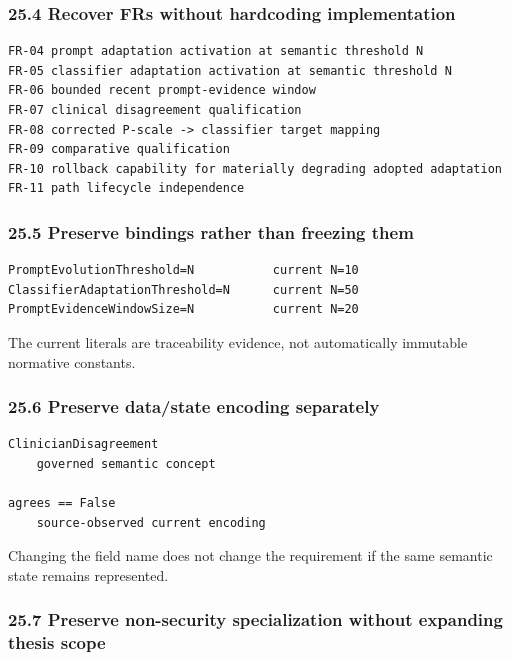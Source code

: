 \documentclass[11pt,a4paper]{article}
\begin{document}
\subsubsection{25.4 Recover FRs without hardcoding
implementation}\label{254-recover-frs-without-hardcoding-implementation}

\begin{verbatim}
FR-04 prompt adaptation activation at semantic threshold N
FR-05 classifier adaptation activation at semantic threshold N
FR-06 bounded recent prompt-evidence window
FR-07 clinical disagreement qualification
FR-08 corrected P-scale -> classifier target mapping
FR-09 comparative qualification
FR-10 rollback capability for materially degrading adopted adaptation
FR-11 path lifecycle independence
\end{verbatim}

\subsubsection{25.5 Preserve bindings rather than freezing
them}\label{255-preserve-bindings-rather-than-freezing-them}

\begin{verbatim}
PromptEvolutionThreshold=N           current N=10
ClassifierAdaptationThreshold=N      current N=50
PromptEvidenceWindowSize=N           current N=20
\end{verbatim}

The current literals are traceability evidence, not automatically
immutable normative constants.

\subsubsection{25.6 Preserve data/state encoding
separately}\label{256-preserve-datastate-encoding-separately}

\begin{verbatim}
ClinicianDisagreement
    governed semantic concept

agrees == False
    source-observed current encoding
\end{verbatim}

Changing the field name does not change the requirement if the same
semantic state remains represented.

\subsubsection{25.7 Preserve non-security specialization without
expanding thesis
scope}\label{257-preserve-non-security-specialization-without-expanding-thesis-scope}
\end{document}

